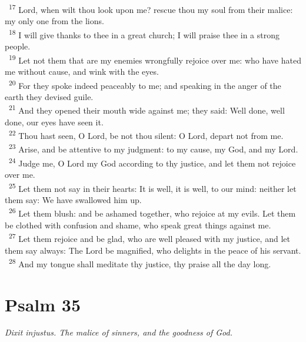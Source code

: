 \documentclass[a5paper,12pt]{article}
\begin{document}
\begin{multicols*}{2}
~\textsuperscript{17} Lord, when wilt thou look upon me? rescue thou my soul from their malice: my only one from the lions.\\
~\textsuperscript{18} I will give thanks to thee in a great church; I will praise thee in a strong people.\\
~\textsuperscript{19} Let not them that are my enemies wrongfully rejoice over me: who have hated me without cause, and wink with the eyes.\\
~\textsuperscript{20} For they spoke indeed peaceably to me; and speaking in the anger of the earth they devised guile.\\
~\textsuperscript{21} And they opened their mouth wide against me; they said: Well done, well done, our eyes have seen it.\\
~\textsuperscript{22} Thou hast seen, O Lord, be not thou silent: O Lord, depart not from me.\\
~\textsuperscript{23} Arise, and be attentive to my judgment: to my cause, my God, and my Lord.\\
~\textsuperscript{24} Judge me, O Lord my God according to thy justice, and let them not rejoice over me.\\
~\textsuperscript{25} Let them not say in their hearts: It is well, it is well, to our mind: neither let them say: We have swallowed him up.\\
~\textsuperscript{26} Let them blush: and be ashamed together, who rejoice at my evils. Let them be clothed with confusion and shame, who speak great things against me.\\
~\textsuperscript{27} Let them rejoice and be glad, who are well pleased with my justice, and let them say always: The Lord be magnified, who delights in the peace of his servant.\\
~\textsuperscript{28} And my tongue shall meditate thy justice, thy praise all the day long.\\

\section{Psalm 35}
\label{sec:orge419fac}
\emph{Dixit injustus. The malice of sinners, and the goodness of God.}\\


\end{multicols*}
\end{document}
